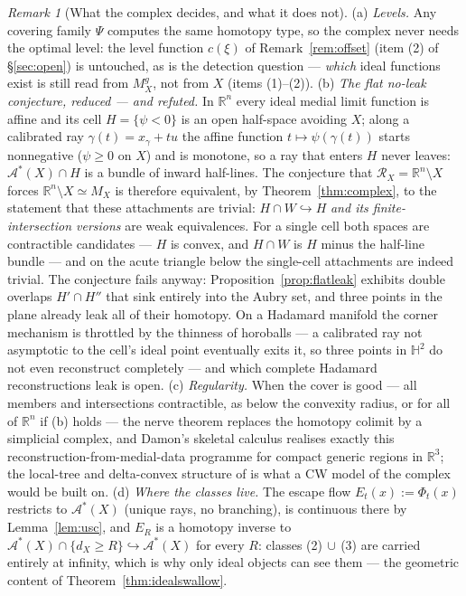 \documentclass[11pt]{article}
\theoremstyle{remark}
\newtheorem{remark}[theorem]{Remark}
\newcommand{\R}{\mathbb{R}}
\newcommand{\X}{X}
\newcommand{\Mx}{M_{\X}}
\newcommand{\Mg}{M^{g}_{\X}}
\newcommand{\Rx}{\mathcal{R}_{\X}}
\newcommand{\dX}{d_{\X}}
\newcommand{\HH}{\mathbb{H}}
\newcommand{\Aub}{\mathcal{A}^{\ast}}
\begin{document}
\begin{remark}[What the complex decides, and what it does not]
\label{rem:complexlimits}
(a) \emph{Levels.} Any covering family $\Psi$ computes the same
homotopy type, so the complex never needs the optimal level: the
level function $c(\xi)$ of Remark~\ref{rem:offset} (item (2) of
\S\ref{sec:open}) is untouched, as is the detection question ---
\emph{which} ideal functions exist is still read from $\Mg$, not
from $\X$ (items (1)--(2)).
(b) \emph{The flat no-leak conjecture, reduced --- and refuted.} In
$\R^{n}$ every ideal medial limit function is affine and its cell
$H=\{\psi<0\}$ is an open half-space avoiding $\X$; along a
calibrated ray $\gamma(t)=x_{\gamma}+tu$ the affine function
$t\mapsto\psi(\gamma(t))$ starts nonnegative
($\psi\ge0$ on $\X$) and is monotone, so a ray that enters $H$ never
leaves: $\Aub(\X)\cap H$ is a bundle of inward half-lines. The
conjecture that $\Rx=\R^{n}\setminus\X$ forces
$\R^{n}\setminus\X\simeq\Mx$ is therefore equivalent, by
Theorem~\ref{thm:complex}, to the statement that these attachments
are trivial: $H\cap W\hookrightarrow H$ \emph{and its
finite-intersection versions} are weak equivalences. For a single
cell both spaces are contractible candidates --- $H$ is convex, and
$H\cap W$ is $H$ minus the half-line bundle --- and on the acute
triangle below the single-cell attachments are indeed trivial. The
conjecture fails anyway: Proposition~\ref{prop:flatleak} exhibits
double overlaps $H'\cap H''$ that sink entirely into the Aubry set,
and three points in the plane already leak all of their homotopy.
On a Hadamard manifold the corner mechanism is throttled by the
thinness of horoballs --- a calibrated ray not asymptotic to the
cell's ideal point eventually exits it, so three points in
$\HH^{2}$ do not even reconstruct completely --- and which complete
Hadamard reconstructions leak is open.
(c) \emph{Regularity.} When the cover is good --- all members and
intersections contractible, as below the convexity radius, or for
all of $\R^{n}$ if (b) holds --- the nerve theorem \cite{Bor}
replaces the homotopy colimit by a simplicial complex, and Damon's
skeletal calculus \cite{Dam} realises exactly this
reconstruction-from-medial-data programme for compact generic
regions in $\R^{3}$; the local-tree and delta-convex structure of
\cite{TS,MT} is what a CW model of the complex would be built on.
(d) \emph{Where the classes live.} The escape flow
$E_{t}(x):=\Phi_{t}(x)$ restricts to $\Aub(\X)$ (unique rays, no
branching), is continuous there by Lemma~\ref{lem:usc}, and
$E_{R}$ is a homotopy inverse to
$\Aub(\X)\cap\{\dX\ge R\}\hookrightarrow\Aub(\X)$ for every $R$:
classes (2)$\,\cup\,$(3) are carried entirely at infinity, which is
why only ideal objects can see them --- the geometric content of
Theorem~\ref{thm:idealswallow}.
\end{remark}
\end{document}
